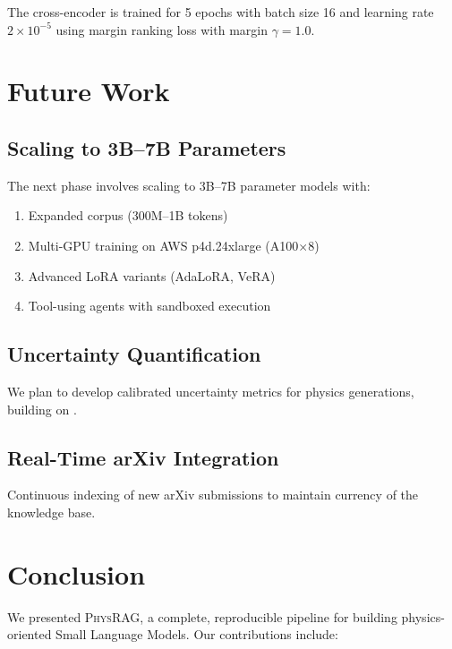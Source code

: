 \documentclass[11pt,a4paper]{article}
\theoremstyle{plain}
\theoremstyle{definition}
\newcommand{\model}{\textsc{PhysRAG}}
\begin{document}
The cross-encoder is trained for 5 epochs with batch size 16 and
learning rate $2 \times 10^{-5}$ using margin ranking loss with
margin $\gamma = 1.0$.

\section{Future Work}

\subsection{Scaling to 3B--7B Parameters}

The next phase involves scaling to 3B--7B parameter models with:

\begin{enumerate}[leftmargin=*,itemsep=2pt]
    \item Expanded corpus (300M--1B tokens)
    \item Multi-GPU training on AWS p4d.24xlarge (A100$\times$8)
    \item Advanced LoRA variants (AdaLoRA, VeRA)
    \item Tool-using agents with sandboxed execution
\end{enumerate}

\subsection{Uncertainty Quantification}

We plan to develop calibrated uncertainty metrics for physics
generations, building on \citet{kadavath2022language}.

\subsection{Real-Time arXiv Integration}

Continuous indexing of new arXiv submissions to maintain currency
of the knowledge base.

\section{Conclusion}

We presented \model{}, a complete, reproducible pipeline for building
physics-oriented Small Language Models. Our contributions include:
\end{document}
